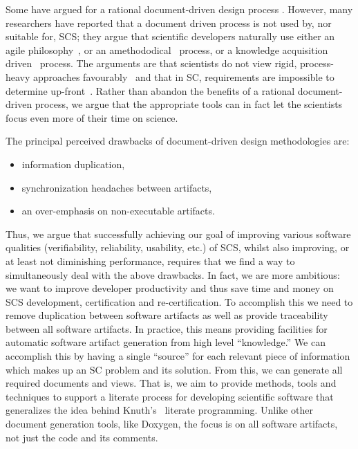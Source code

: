 \documentclass{sig-alternate-05-2015}
\begin{document}
Some have argued for a rational document-driven design process 
\cite{SmithAndKoothoor2016}.  However, many researchers have
reported that a document driven process is not used by, nor suitable for, SCS;
they argue that scientific developers naturally use either an agile
philosophy~\cite{CarverEtAl2007, EasterbrookAndJohns2009, Segal2005}, or an
amethododical~\cite{Kelly2013} process, or a knowledge acquisition
driven~\cite{Kelly2015} process.  The arguments are that scientists do not
view rigid, process-heavy approaches favourably~\cite{CarverEtAl2007} and that
in SC, requirements are impossible to determine up-front~\cite{CarverEtAl2007,
  SegalAndMorris2008}.  Rather than abandon the benefits of a rational
document-driven process, we argue that the appropriate tools can in fact
let the scientists focus even more of their time on science.

The principal perceived drawbacks of document-driven design methodologies are:
\begin{itemize}
\setlength{\itemsep}{0.0em}
\setlength{\parskip}{0pt}
\setlength{\parsep}{0pt}
\item information duplication,
\item synchronization headaches between artifacts,
\item an over-emphasis on non-executable artifacts.
\end{itemize}

Thus, we argue that successfully achieving our goal of improving various
software qualities (verifiability, reliability, usability, etc.) of SCS, whilst
also improving, or at least not diminishing performance, requires that we find a
way to simultaneously deal with the above drawbacks. In fact, we are more
ambitious: we want to improve developer productivity and thus save time and
money on SCS development, certification and re-certification. To accomplish this
we need to remove duplication between software artifacts \cite{WilsonEtAl2013}
as well as provide traceability between all software artifacts. In practice,
this means providing facilities for automatic software artifact generation from
high level ``knowledge.'' We can accomplish this by having a single ``source''
for each relevant piece of information which makes up an SC problem and its
solution. From this, we can generate all required documents and views. That is,
we aim to provide methods, tools and techniques to support a literate process
for developing scientific software that generalizes the idea behind
Knuth's~\cite{Knuth1984} literate programming. Unlike other document generation
tools, like Doxygen, the focus is on all software artifacts, not just the code
and its comments.
\end{document}

